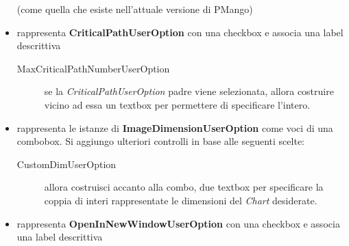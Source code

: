 \begin{itemize}
  (come quella che esiste nell'attuale versione di PMango)
  \item rappresenta \textbf{CriticalPathUserOption} con una checkbox e associa una
  label descrittiva
  \begin{description}
    \item[MaxCriticalPathNumberUserOption] se la
    \emph{CriticalPathUserOption} padre viene selezionata, allora
    costruire vicino ad essa un textbox per permettere di specificare l'intero.
  \end{description}
  \item rappresenta le istanze di \textbf{ImageDimensionUserOption} come voci di
  una combobox. Si aggiungo ulteriori controlli in base alle seguenti scelte:
  \begin{description}
    \item[CustomDimUserOption] allora costruisci accanto alla combo, due
    textbox per specificare la coppia di interi rappresentate le dimensioni del
    \emph{Chart} desiderate.
  \end{description}
  \item rappresenta \textbf{OpenInNewWindowUserOption} con una checkbox e associa una
  label descrittiva
\end{itemize}